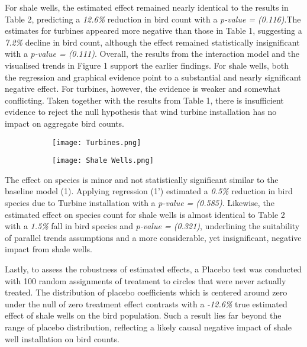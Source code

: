 \documentclass{article}
\begin{document}
\addlinespace

For shale wells, the estimated effect remained nearly identical to the results in Table 2, predicting a \textit{12.6\%} reduction in bird count with a \textit{p-value = (0.116)}.The estimates for turbines appeared more negative than those in Table 1, suggesting a \textit{7.2\%} decline in bird count, although the effect remained statistically insignificant with a \textit{p-value = (0.111)}. Overall, the results from the interaction model and the visualised trends in Figure 1 support the earlier findings. For shale wells, both the regression and graphical evidence point to a substantial and nearly significant negative effect. For turbines, however, the evidence is weaker and somewhat conflicting. Taken together with the results from Table 1, there is insufficient evidence to reject the null hypothesis that wind turbine installation has no impact on aggregate bird counts.

\begin{center}
\end{center}

\begin{figure}[H]
    \centering
    \begin{subfigure}[t]{0.49\textwidth}
        \centering
        \texttt{[image: Turbines.png]}
    \end{subfigure}
    \hspace{0pt} %
    \begin{subfigure}[t]{0.49\textwidth}
        \centering
        \texttt{[image: Shale Wells.png]}
    \end{subfigure}
\end{figure}

\addlinespace

The effect on species is minor and not statistically significant similar to the baseline model (1). Applying regression (1') estimated a \textit{0.5\%} reduction in bird species due to Turbine installation with a \textit{p-value = (0.585)}. Likewise, the estimated effect on species count for shale wells is almost identical to Table 2 with a \textit{1.5\%} fall in bird species and \textit{p-value = (0.321)}, underlining the suitability of parallel trends assumptions and a more considerable, yet insignificant, negative impact from shale wells.

\addlinespace

Lastly, to assess the robustness of estimated effects, a Placebo test was conducted with 100 random assignments of treatment to circles that were never actually treated. The distribution of placebo coefficients which is centered around zero under the null of zero treatment effect contrasts with a \textit{-12.6\%} true estimated effect of shale wells on the bird population. Such a result lies far beyond the range of placebo distribution, reflecting a likely causal negative impact of shale well installation on bird counts.
\end{document}

